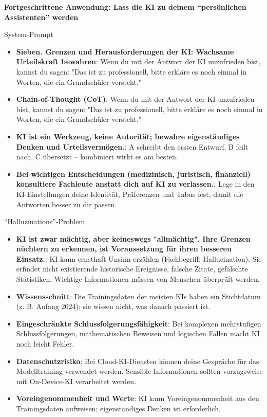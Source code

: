\textbf{Fortgeschrittene Anwendung: Lass die KI zu deinem “persönlichen Assistenten” werden}\par

System-Prompt

\begin{itemize}
  \item \textbf{Sieben. Grenzen und Herausforderungen der KI: Wachsame Urteilskraft bewahren}: Wenn du mit der Antwort der KI unzufrieden bist, kannst du sagen: "Das ist zu professionell, bitte erkläre es noch einmal in Worten, die ein Grundschüler versteht."
  \item \textbf{Chain-of-Thought (CoT)}: Wenn du mit der Antwort der KI unzufrieden bist, kannst du sagen: "Das ist zu professionell, bitte erkläre es noch einmal in Worten, die ein Grundschüler versteht."
  \item \textbf{KI ist ein Werkzeug, keine Autorität; bewahre eigenständiges Denken und Urteilsvermögen.}: A schreibt den ersten Entwurf, B feilt nach, C übersetzt – kombiniert wirkt es am besten.
  \item \textbf{Bei wichtigen Entscheidungen (medizinisch, juristisch, finanziell) konsultiere Fachleute anstatt dich auf KI zu verlassen.}: Lege in den KI-Einstellungen deine Identität, Präferenzen und Tabus fest, damit die Antworten besser zu dir passen.
\end{itemize}


“Halluzinations”-Problem

\begin{itemize}
  \item \textbf{KI ist zwar mächtig, aber keineswegs "allmächtig". Ihre Grenzen nüchtern zu erkennen, ist Voraussetzung für ihren besseren Einsatz.}: KI kann ernsthaft Unsinn erzählen (Fachbegriff: Hallucination). Sie erfindet nicht existierende historische Ereignisse, falsche Zitate, gefälschte Statistiken. Wichtige Informationen müssen von Menschen überprüft werden.
  \item \textbf{Wissensschnitt}: Die Trainingsdaten der meisten KIs haben ein Stichtdatum (z. B. Anfang 2024); sie wissen nicht, was danach passiert ist.
  \item \textbf{Eingeschränkte Schlussfolgerungsfähigkeit}: Bei komplexen mehrstufigen Schlussfolgerungen, mathematischen Beweisen und logischen Fallen macht KI noch leicht Fehler.
  \item \textbf{Datenschutzrisiko}: Bei Cloud-KI-Diensten können deine Gespräche für das Modelltraining verwendet werden. Sensible Informationen sollten vorzugsweise mit On-Device-KI verarbeitet werden.
  \item \textbf{Voreingenommenheit und Werte}: KI kann Voreingenommenheit aus den Trainingsdaten aufweisen; eigenständiges Denken ist erforderlich.
\end{itemize}


